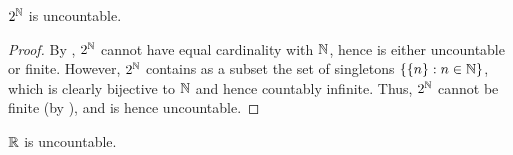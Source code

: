 \begin{cor}\label{i:8.3.3}
  \(2^{\mathbb{N}}\) is uncountable.
\end{cor}

\begin{proof}
  By , \(2^{\mathbb{N}}\) cannot have equal cardinality with \(\mathbb{N}\), hence is either uncountable or finite.
  However, \(2^{\mathbb{N}}\) contains as a subset the set of singletons \(\left\lbrace\left\lbrace n\right\rbrace : n \in \mathbb{N}\right\rbrace\), which is clearly bijective to \(\mathbb{N}\) and hence countably infinite.
  Thus, \(2^{\mathbb{N}}\) cannot be finite (by ), and is hence uncountable.
\end{proof}

\begin{cor}\label{i:8.3.4}
  \(\mathbb{R}\) is uncountable.
\end{cor}

